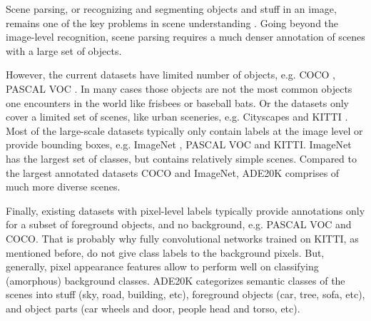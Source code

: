 \documentclass[12pt,a4paper,table,dvipsnames,tikz]{report}
\newcommand{\acronym}{\MakeUppercase}
\begin{document}
	Scene parsing, or recognizing and segmenting objects and stuff in an image, remains one 
	of the key problems in scene understanding \citep{Zhou_sem}. Going beyond the image-level 
	recognition, scene parsing requires a much denser annotation of scenes with a large set 
	of objects. 
	\par
	However, the current datasets have limited number of objects, e.g. \acronym{coco} 
	\citep{coco}, \acronym{pascal voc} \citep{pascal}. In many cases those objects are not 
	the most common objects one encounters in the world like frisbees or baseball bats. 
	Or the datasets only cover a limited set of scenes, like urban sceneries, e.g. Cityscapes 
	\citep{cityscapes} and \acronym{kitti} \citep{kitti}. Most of the large-scale datasets 
	typically only contain labels at the image level or provide bounding boxes, e.g. ImageNet 
	\citep{Deng}, \acronym{pascal voc} and \acronym{kitti}. ImageNet has the largest set of 
	classes, but contains relatively simple scenes. Compared to the largest annotated datasets 
	\acronym{coco} and ImageNet, \acronym{ade20k} \citep{Zhou_pars} comprises of much more 
	diverse scenes. 
	\par
	Finally, existing datasets with pixel-level labels typically provide annotations only 
	for a subset of foreground objects, and no background, e.g. \acronym{pascal voc} and 
	\acronym{coco}. That is probably why fully convolutional networks trained on \acronym{kitti}, 
	as mentioned before, do not give class labels to the background pixels. But, generally, 
	pixel appearance features allow to perform well on classifying (amorphous) background 
	classes. \acronym{ade20k} categorizes semantic classes of the scenes into stuff (sky, 
	road, building, etc), foreground objects (car, tree, sofa, etc), and object parts (car 
	wheels and door, people head and torso, etc).
	\\
	
\end{document}
